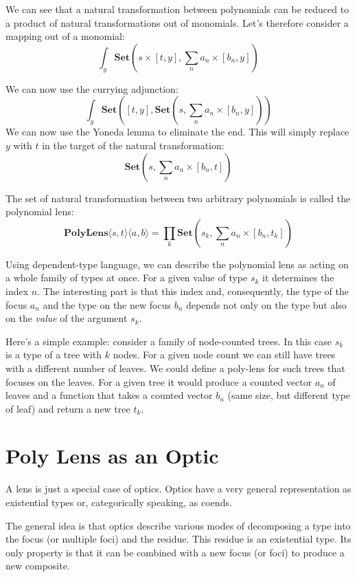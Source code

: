 \documentclass[11pt]{amsart}
\begin{document}
We can see that a natural transformation between polynomials can be reduced to a product of natural transformations out of monomials. Let's therefore consider a mapping out of a monomial:
\[ \int_y \mathbf{Set} \left( s \times [t, y], \sum_n a_n \times [b_n, y]\right) \]
 
 We can now use the currying adjunction:
\[ \int_y \mathbf{Set} \left( 
    [t, y],  \mathbf{Set}\left(s, \sum_n a_n \times [b_n, y]\right)  \right) \]
 We can now use the Yoneda lemma to eliminate the end. This will simply replace $y$ with $t$ in the target of the natural transformation:
 \[ \mathbf{Set}\left(s, \sum_n a_n \times [b_n, t] \right) \]
 
The set of natural transformation between two arbitrary polynomials is called the polynomial lens:
 \[ \mathbf{PolyLens}\langle s, t\rangle \langle a, b\rangle = \prod_k \mathbf{Set}\left(s_k, \sum_n a_n \times [b_n, t_k] \right) \]

Using dependent-type language, we can describe the polynomial lens as acting on a whole family of types at once. For a given value of type $s_k$ it determines the index $n$. The interesting part is that this index and, consequently, the type of the focus $a_n$ and the type on the new focus $b_n$ depends not only on the type but also on the \emph{value} of the argument $s_k$. 

Here's a simple example: consider a family of node-counted trees. In this case $s_k$ is a type of a tree with $k$ nodes. For a given node count we can still have trees with a different number of leaves. We could define a poly-lens for such trees that focuses on the leaves. For a given tree it would produce a counted vector $a_n$ of leaves and a function that takes a counted vector $b_n$  (same size, but different type of leaf) and return a new tree $t_k$. 

\section{Poly Lens as an Optic}

A lens is just a special case of optics. Optics have a very general representation as existential types or, categorically speaking, as coends. 

The general idea is that optics describe various modes of decomposing a type into the focus (or multiple foci) and the residue. This residue is an existential type. Its only property is that it can be combined with a new focus (or foci) to produce a new composite.
\end{document}
